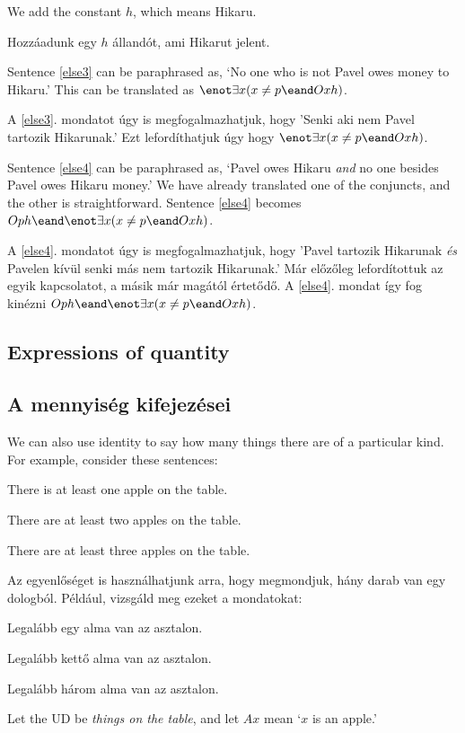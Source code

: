 

We add the constant $h$, which means Hikaru.

Hozzáadunk egy $h$ állandót, ami Hikarut jelent.

Sentence \ref{else3} can be paraphrased as, `No one who is not Pavel owes money to Hikaru.' This can be translated as $\enot\exists x(x\neq p \eand Oxh)$.

A \ref{else3}. mondatot úgy is megfogalmazhatjuk, hogy 'Senki aki nem Pavel tartozik Hikarunak.' Ezt lefordíthatjuk úgy hogy $\enot\exists x(x\neq p \eand Oxh)$.

Sentence \ref{else4} can be paraphrased as, `Pavel owes Hikaru \emph{and} no one besides Pavel owes Hikaru money.' We have already translated one of the conjuncts, and the other is straightforward. Sentence \ref{else4} becomes $Oph \eand \enot\exists x(x\neq p \eand Oxh)$.

A \ref{else4}. mondatot úgy is megfogalmazhatjuk, hogy 'Pavel tartozik Hikarunak \emph{és} Pavelen kívül senki más nem tartozik Hikarunak.' Már előzőleg lefordítottuk az egyik kapcsolatot, a másik már magától értetődő. A \ref{else4}. mondat így fog kinézni $Oph \eand \enot\exists x(x\neq p \eand Oxh)$.


\subsection*{Expressions of quantity}
\subsection{A mennyiség kifejezései}
We can also use identity to say how many things there are of a particular kind. For example, consider these sentences:
\begin{earg}
\item[\ex{atleast1}] There is at least one apple on the table.
\item[\ex{atleast2}] There are at least two apples on the table.
\item[\ex{atleast3}] There are at least three apples on the table.
\end{earg}

Az egyenlőséget is használhatjunk arra, hogy megmondjuk, hány darab van egy dologból. Például, vizsgáld meg ezeket a mondatokat:
\begin{earg}
\item[\ex{atleast1}] Legalább egy alma van az asztalon.
\item[\ex{atleast2}] Legalább kettő alma van az asztalon.
\item[\ex{atleast3}] Legalább három alma van az asztalon.
\end{earg}
Let the UD be \emph{things on the table}, and let $Ax$ mean `$x$ is an apple.'

